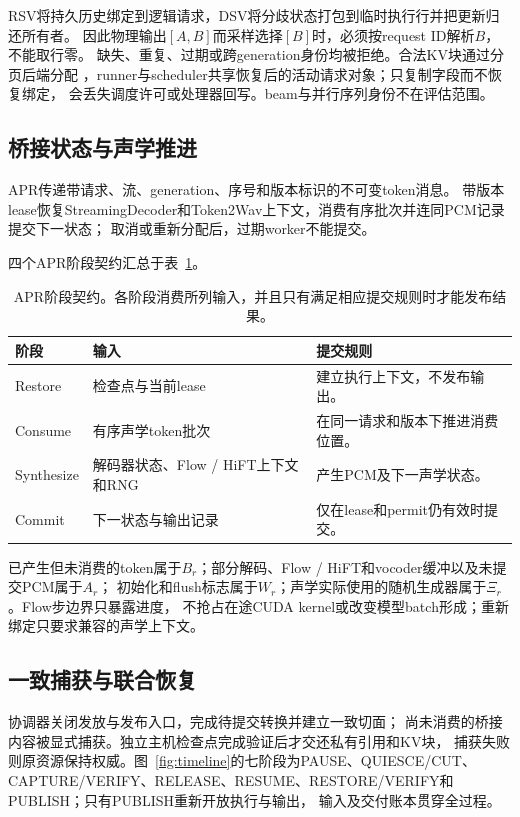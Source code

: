 \documentclass{article}
\begin{document}
RSV将持久历史绑定到逻辑请求，DSV将分歧状态打包到临时执行行并把更新归还所有者。
因此物理输出$[A,B]$而采样选择$[B]$时，必须按request ID解析$B$，不能取行零。
缺失、重复、过期或跨generation身份均被拒绝。合法KV块通过分页后端分配
\citep{vllm2023}，runner与scheduler共享恢复后的活动请求对象；只复制字段而不恢复绑定，
会丢失调度许可或处理器回写。beam与并行序列身份不在评估范围。

\subsection{桥接状态与声学推进}
\label{sec:design_acoustic}

APR传递带请求、流、generation、序号和版本标识的不可变token消息。
带版本lease恢复StreamingDecoder和Token2Wav上下文，消费有序批次并连同PCM记录提交下一状态；
取消或重新分配后，过期worker不能提交。

四个APR阶段契约汇总于表~\ref{tab:apr_progression}。
\begin{table}[t]
\centering
\small
\caption{APR阶段契约。各阶段消费所列输入，并且只有满足相应提交规则时才能发布结果。}\label{tab:apr_progression}
\begin{tabular}{@{}p{.17\linewidth}p{.29\linewidth}p{.40\linewidth}@{}}
\toprule
阶段 & 输入 & 提交规则 \\
\midrule
Restore & 检查点与当前lease & 建立执行上下文，不发布输出。 \\
Consume & 有序声学token批次 & 在同一请求和版本下推进消费位置。 \\
Synthesize & 解码器状态、Flow / HiFT上下文和RNG & 产生PCM及下一声学状态。 \\
Commit & 下一状态与输出记录 & 仅在lease和permit仍有效时提交。 \\
\bottomrule\end{tabular}
\end{table}

已产生但未消费的token属于$B_r$；部分解码、Flow / HiFT和vocoder缓冲以及未提交PCM属于$A_r$；
初始化和flush标志属于$W_r$；声学实际使用的随机生成器属于$\Xi_r$。Flow步边界只暴露进度，
不抢占在途CUDA kernel或改变模型batch形成；重新绑定只要求兼容的声学上下文。

\subsection{一致捕获与联合恢复}
\label{sec:design_protocol}

协调器关闭发放与发布入口，完成待提交转换并建立一致切面\citep{chandy1985}；
尚未消费的桥接内容被显式捕获。独立主机检查点完成验证后才交还私有引用和KV块，
捕获失败则原资源保持权威。图~\ref{fig:timeline}的七阶段为PAUSE、QUIESCE/CUT、
CAPTURE/VERIFY、RELEASE、RESUME、RESTORE/VERIFY和PUBLISH；只有PUBLISH重新开放执行与输出，
输入及交付账本贯穿全过程。
\end{document}

